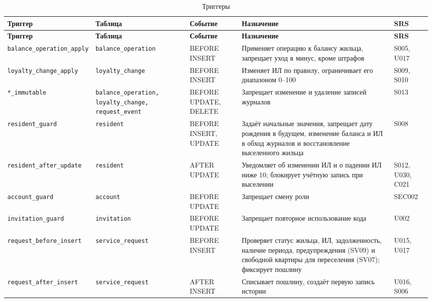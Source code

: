 \documentclass[12pt,a4paper]{article}
\begin{document}
\begin{longtable}{L{33.3mm} L{30.5mm} L{20.4mm} L{48.1mm} L{15.7mm}}
\caption{Триггеры}\label{tab:triggers}\\
\toprule \textbf{Триггер} & \textbf{Таблица} & \textbf{Событие} & \textbf{Назначение} & \textbf{SRS} \\ \midrule
\endfirsthead
\toprule \textbf{Триггер} & \textbf{Таблица} & \textbf{Событие} & \textbf{Назначение} & \textbf{SRS} \\ \midrule
\endhead
\bottomrule
\endfoot
\texttt{balance\_\allowbreak{}operation\_\allowbreak{}apply} & \texttt{balance\_\allowbreak{}operation} & BEFORE INSERT & Применяет операцию к балансу жильца, запрещает уход в минус, кроме штрафов & S005, U017 \\
\texttt{loyalty\_\allowbreak{}change\_\allowbreak{}apply} & \texttt{loyalty\_\allowbreak{}change} & BEFORE INSERT & Изменяет ИЛ по правилу, ограничивает его диапазоном 0--100 & S009, S010 \\
\texttt{*\_\allowbreak{}immutable} & \texttt{balance\_\allowbreak{}operation, loyalty\_\allowbreak{}change, request\_\allowbreak{}event} & BEFORE UPDATE, DELETE & Запрещает изменение и удаление записей журналов & S013 \\
\texttt{resident\_\allowbreak{}guard} & \texttt{resident} & BEFORE INSERT, UPDATE & Задаёт начальные значения, запрещает дату рождения в будущем, изменение баланса и ИЛ в обход журналов и восстановление выселенного жильца & S008 \\
\texttt{resident\_\allowbreak{}after\_\allowbreak{}update} & \texttt{resident} & AFTER UPDATE & Уведомляет об изменении ИЛ и о падении ИЛ ниже 10; блокирует учётную запись при выселении & S012, U030, C021 \\
\texttt{account\_\allowbreak{}guard} & \texttt{account} & BEFORE UPDATE & Запрещает смену роли & SEC002 \\
\texttt{invitation\_\allowbreak{}guard} & \texttt{invitation} & BEFORE UPDATE & Запрещает повторное использование кода & U002 \\
\texttt{request\_\allowbreak{}before\_\allowbreak{}insert} & \texttt{service\_\allowbreak{}request} & BEFORE INSERT & Проверяет статус жильца, ИЛ, задолженность, наличие периода, предупреждения (SV09) и свободной квартиры для переселения (SV07); фиксирует пошлину & U015, U017 \\
\texttt{request\_\allowbreak{}after\_\allowbreak{}insert} & \texttt{service\_\allowbreak{}request} & AFTER INSERT & Списывает пошлину, создаёт первую запись истории & U016, S006 \\

\end{longtable}
\end{document}
